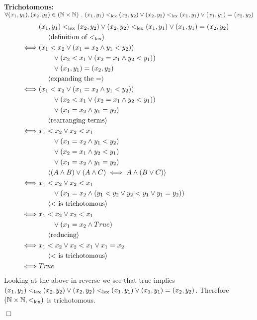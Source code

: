 \documentclass[11pt,fleqn]{article}
\newcommand{\sglsp}{\ }
\newenvironment{proof}{\par\noindent{\bf Proof\sglsp}}{\hfill$\Box$}
\newcommand{\pnote}[1]{{\langle \text{#1} \rangle}}
\begin{document}
\begin{proof}
	\textbf{Trichotomous:} $\forall (x_1,y_1),(x_2,y_2) \in (\mathbb{N} \times \mathbb{N}) ~.~ (x_1,y_1) <_{\rm lex} (x_2,y_2) \vee (x_2,y_2) <_{\rm lex} (x_1,y_1) \vee (x_1,y_1) = (x_2,y_2)$\\
	\begin{align*}
		& (x_1,y_1) <_{\rm lex} (x_2,y_2) \vee (x_2,y_2) <_{\rm lex} (x_1,y_1) \vee (x_1,y_1) = (x_2,y_2) & \\
		& ~~~~\pnote{definition of $<_{\rm lex}$} & \\
		\iff & (x_1 < x_2 \vee (x_1 = x_2 \wedge y_1 < y_2)) & \\
		& ~~~~~~\vee (x_2 < x_1 \vee (x_2 = x_1 \wedge y_2 < y_1)) & \\
		& ~~~~~~\vee (x_1,y_1) = (x_2,y_2) & \\
		& ~~~~\pnote{expanding the =} & \\
		\iff & (x_1 < x_2 \vee (x_1 = x_2 \wedge y_1 < y_2)) & \\
		& ~~~~~~\vee (x_2 < x_1 \vee (x_2 = x_1 \wedge y_2 < y_1)) & \\
		& ~~~~~~\vee (x_1 = x_2 \wedge y_1 = y_2) & \\
		& ~~~~\pnote{rearranging terms} & \\
		\iff & x_1 < x_2 \vee x_2 < x_1 & \\
		& ~~~~~~\vee (x_1 = x_2 \wedge y_1 < y_2) & \\
		& ~~~~~~\vee (x_2 = x_1 \wedge y_2 < y_1) & \\
		& ~~~~~~\vee (x_1 = x_2 \wedge y_1 = y_2) & \\
		& ~~~~\pnote{$(A \wedge B) \vee (A \wedge C) \iff A \wedge (B \vee C)$} & \\
		\iff & x_1 < x_2 \vee x_2 < x_1 & \\
		& ~~~~~~\vee (x_1 = x_2 \wedge (y_1 < y_2 \vee y_2 < y_1 \vee y_1 = y_2)) & \\
		& ~~~~\pnote{$<$ is trichotomous} & \\
		\iff & x_1 < x_2 \vee x_2 < x_1 & \\
		& ~~~~~~\vee (x_1 = x_2 \wedge True) & \\
		& ~~~~\pnote{reducing} & \\
		\iff & x_1 < x_2 \vee x_2 < x_1 \vee x_1 = x_2 & \\
		& ~~~~\pnote{$<$ is trichotomous} & \\
		\iff & True & \\
	\end{align*}
	Looking at the above in reverse we see that true implies $(x_1,y_1) <_{\rm lex} (x_2,y_2) \vee (x_2,y_2) <_{\rm lex} (x_1,y_1) \vee (x_1,y_1) = (x_2,y_2)$.
	Therefore $(\mathbb{N} \times \mathbb{N},<_{\rm lex})$ is trichotomous.
	\medskip
	

\end{proof}
\end{document}
